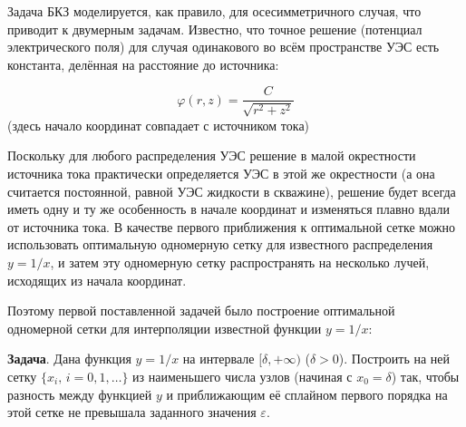 Задача БКЗ моделируется, как правило, для осесимметричного случая, что приводит к двумерным задачам.
Известно, что точное решение (потенциал электрического поля) для случая одинакового во всём пространстве
УЭС есть константа, делённая на расстояние до источника:

$$\varphi(r, z)=\frac{C}{\sqrt{r^2+z^2}}$$ (здесь начало координат совпадает с источником тока)

Поскольку для любого распределения УЭС решение в малой окрестности источника тока практически определяется
УЭС в этой же окрестности (а она считается постоянной, равной УЭС жидкости в скважине), решение будет всегда
иметь одну и ту же особенность в начале координат и изменяться плавно вдали от источника тока.
В качестве первого приближения к оптимальной сетке можно использовать оптимальную одномерную сетку
для известного распределения ${y=1/x}$, и затем эту одномерную сетку распространять на несколько лучей,
исходящих из начала координат.

Поэтому первой поставленной задачей было построение оптимальной одномерной сетки для интерполяции
известной функции ${y=1/x}$:

{\bf Задача}. Дана функция ${y=1/x}$ на интервале ${[\delta, +\infty)}$ (${\delta > 0}$). Построить на ней сетку
${\{x_i,\,i=0,1,\dots\}}$ из наименьшего числа узлов (начиная с ${x_0=\delta}$) так, чтобы разность между
функцией ${y}$ и приближающим её сплайном первого порядка на этой сетке не превышала заданного значения
${\varepsilon}$.

\def\ibreak{& \\ &}
\def\iline{& \\ \cline{1-2} &}

\makeatletter
\newenvironment{customenv}
  {\align &} %
  {& \endalign}

\newenvironment{systemed}
  {\left\{ \begin{aligned} &}
  {& \end{aligned} \right.}

\newenvironment{totalited}
  {\left[ \begin{aligned} &}
  {& \end{aligned} \right.}


